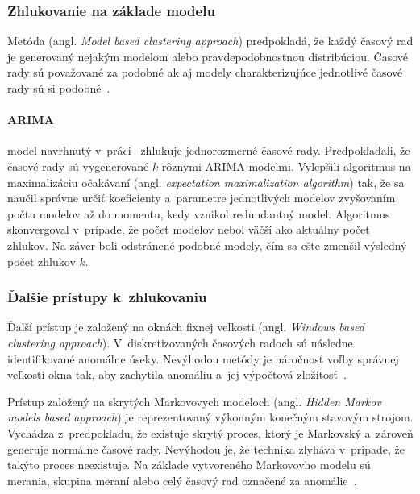 \documentclass[a4paper,twoside,slovak,12pt,appendix]{article}
\begin{document}
\subsubsection{Zhlukovanie na základe modelu}
\label{c:model-clustering}
Metóda (angl. \textit{Model based clustering approach}) predpokladá, že každý
časový rad je generovaný nejakým modelom alebo pravdepodobnostnou distribúciou.
Časové rady sú považované za podobné ak aj modely charakterizujúce jednotlivé
časové rady sú si podobné~\cite{Rani2012}.

\paragraph{ARIMA} model navrhnutý v~práci~\cite{Xiong2002} zhlukuje
jednorozmerné časové rady. Predpokladali, že časové rady sú vygenerované $k$
rôznymi ARIMA modelmi. Vylepšili algoritmus na maximalizáciu očakávaní (angl.
\textit{expectation maximalization algorithm}) tak, že sa naučil správne určiť
koeficienty a~parametre jednotlivých modelov zvyšovaním počtu modelov až do
momentu, kedy vznikol redundantný model. Algoritmus skonvergoval v~prípade, že
počet modelov nebol väčší ako aktuálny počet zhlukov. Na záver boli odstránené
podobné modely, čím sa ešte zmenšil výsledný počet zhlukov $k$.

\subsubsection{Ďalšie prístupy k~zhlukovaniu}
\label{c:other-clustering}
Ďalší prístup je založený na oknách fixnej veľkosti (angl. \textit{Windows based
clustering approach}). V~diskretizovaných časových radoch sú následne
identifikované anomálne úseky. Nevýhodou metódy je náročnosť voľby správnej
veľkosti okna tak, aby zachytila anomáliu a~jej výpočtová
zložitosť~\cite{Teng2010}.

Prístup založený na skrytých Markovovych modeloch (angl. \textit{Hidden Markov
models based approach}) je reprezentovaný výkonným konečným stavovým strojom.
Vychádza z~predpokladu, že existuje skrytý proces, ktorý je Markovský a~zároveň
generuje normálne časové rady. Nevýhodou je, že technika zlyháva v~prípade, že
takýto proces neexistuje. Na základe vytvoreného Markovovho modelu sú merania,
skupina meraní alebo celý časový rad označené za anomálie~\cite{Teng2010}.

\end{document}
